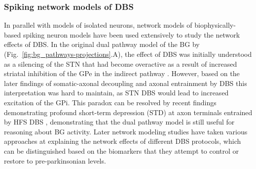 %
\subsubsection{Spiking network models of DBS}
%
%
%
%
%
%

In parallel with models of isolated neurons, network models of biophysically-based
spiking neuron models have been used extensively to study the network effects of DBS.
In the original dual pathway
model of the BG by \cite{albin_functional_1989} (Fig.~\ref{fig:bg_pathways-projections}.A),
the effect of DBS was initially understood as a silencing of the STN that
had become overactive as a result of increased striatal inhibition of the GPe
in the indirect pathway \cite{little_computational_2015}. However, based on
the later findings of somatic-axonal decoupling and axonal entrainment by DBS
\cite{hashimoto_stimulation_2003,mcintyre_cellular_2004,miocinovic_computational_2006}
this interpretation was hard to maintain, as STN DBS would lead to increased
excitation of the GPi. This paradox can be resolved by recent findings demonstrating
profound short-term depression (STD) at axon terminals entrained by HFS DBS \cite{rosenbaum_axonal_2014},
demonstrating that the dual pathway model is still useful for reasoning about
BG activity. Later network modeling studies have taken various approaches at explaining
the network effects of different DBS protocols, which can be distinguished based
on the biomarkers that they attempt to control or restore to pre-parkinsonian levels.

%

